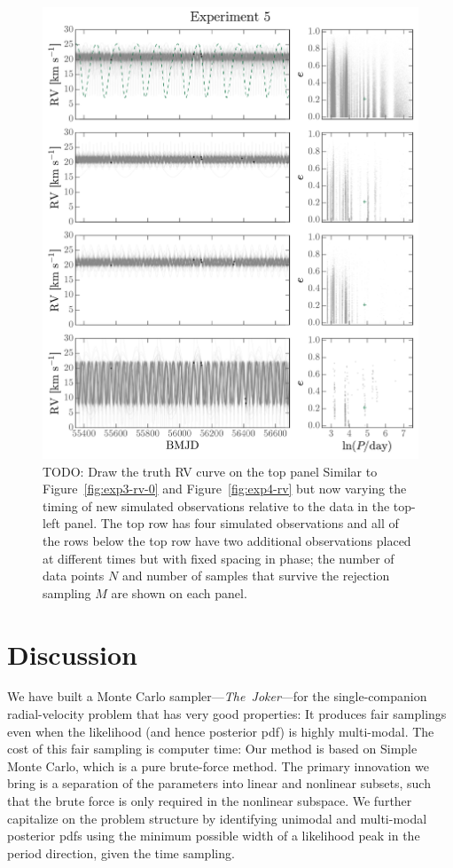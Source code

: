 \documentclass[manuscript, letterpaper]{aastex6}
\newcommand{\project}[1]{\textsl{#1}}
\newcommand{\samplername}{\project{The~Joker}}
\newcommand{\figname}{Figure}
\newcommand{\todo}[1]{{\color{red}TODO: #1}}
\begin{document}
\begin{figure}[p]
\begin{center}
\includegraphics[width=\textwidth]{figures/exp5-rv-curves.pdf}
\end{center}
\caption{%
\todo{Draw the truth RV curve on the top panel}
Similar to \figname~\ref{fig:exp3-rv-0} and \figname~\ref{fig:exp4-rv} but now
varying the timing of new simulated observations relative to the data in the
top-left panel.
The top row has four simulated observations and all of the rows below the top
row have two additional observations placed at different times but with fixed
spacing in phase; the number of data points $N$ and number of samples that
survive the rejection sampling $M$ are shown on each panel.
\label{fig:exp5-rv}}
\end{figure}

\section{Discussion} \label{sec:discussion}

We have built a Monte Carlo sampler---\samplername---for the
single-companion radial-velocity problem that has very good
properties:
It produces fair samplings even when the likelihood (and hence
posterior pdf) is highly multi-modal.
The cost of this fair sampling is computer time:
Our method is based on Simple Monte Carlo, which is a pure brute-force
method.
The primary innovation we bring is a separation of the parameters
into linear and nonlinear subsets, such that the brute force is only
required in the nonlinear subspace.
We further capitalize on the problem structure by identifying unimodal
and multi-modal posterior pdfs using the minimum possible width of a
likelihood peak in the period direction, given the time sampling.
\end{document}

